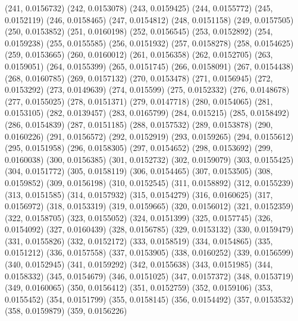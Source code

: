 {					(241, 0.0156732)
					(242, 0.0153078)
					(243, 0.0159425)
					(244, 0.0155772)
					(245, 0.0152119)
					(246, 0.0158465)
					(247, 0.0154812)
					(248, 0.0151158)
					(249, 0.0157505)
					(250, 0.0153852)
					(251, 0.0160198)
					(252, 0.0156545)
					(253, 0.0152892)
					(254, 0.0159238)
					(255, 0.0155585)
					(256, 0.0151932)
					(257, 0.0158278)
					(258, 0.0154625)
					(259, 0.0153665)
					(260, 0.0160012)
					(261, 0.0156358)
					(262, 0.0152705)
					(263, 0.0159051)
					(264, 0.0155399)
					(265, 0.0151745)
					(266, 0.0158091)
					(267, 0.0154438)
					(268, 0.0160785)
					(269, 0.0157132)
					(270, 0.0153478)
					(271, 0.0156945)
					(272, 0.0153292)
					(273, 0.0149639)
					(274, 0.015599)
					(275, 0.0152332)
					(276, 0.0148678)
					(277, 0.0155025)
					(278, 0.0151371)
					(279, 0.0147718)
					(280, 0.0154065)
					(281, 0.0153105)
					(282, 0.0139457)
					(283, 0.0165799)
					(284, 0.015215)
					(285, 0.0158492)
					(286, 0.0154839)
					(287, 0.0151185)
					(288, 0.0157532)
					(289, 0.0153878)
					(290, 0.0160226)
					(291, 0.0156572)
					(292, 0.0152919)
					(293, 0.0159265)
					(294, 0.0155612)
					(295, 0.0151958)
					(296, 0.0158305)
					(297, 0.0154652)
					(298, 0.0153692)
					(299, 0.0160038)
					(300, 0.0156385)
					(301, 0.0152732)
					(302, 0.0159079)
					(303, 0.0155425)
					(304, 0.0151772)
					(305, 0.0158119)
					(306, 0.0154465)
					(307, 0.0153505)
					(308, 0.0159852)
					(309, 0.0156198)
					(310, 0.0152545)
					(311, 0.0158892)
					(312, 0.0155239)
					(313, 0.0151585)
					(314, 0.0157932)
					(315, 0.0154279)
					(316, 0.0160625)
					(317, 0.0156972)
					(318, 0.0153319)
					(319, 0.0159665)
					(320, 0.0156012)
					(321, 0.0152359)
					(322, 0.0158705)
					(323, 0.0155052)
					(324, 0.0151399)
					(325, 0.0157745)
					(326, 0.0154092)
					(327, 0.0160439)
					(328, 0.0156785)
					(329, 0.0153132)
					(330, 0.0159479)
					(331, 0.0155826)
					(332, 0.0152172)
					(333, 0.0158519)
					(334, 0.0154865)
					(335, 0.0151212)
					(336, 0.0157558)
					(337, 0.0153905)
					(338, 0.0160252)
					(339, 0.0156599)
					(340, 0.0152945)
					(341, 0.0159292)
					(342, 0.0155638)
					(343, 0.0151985)
					(344, 0.0158332)
					(345, 0.0154679)
					(346, 0.0151025)
					(347, 0.0157372)
					(348, 0.0153719)
					(349, 0.0160065)
					(350, 0.0156412)
					(351, 0.0152759)
					(352, 0.0159106)
					(353, 0.0155452)
					(354, 0.0151799)
					(355, 0.0158145)
					(356, 0.0154492)
					(357, 0.0153532)
					(358, 0.0159879)
					(359, 0.0156226)
}
